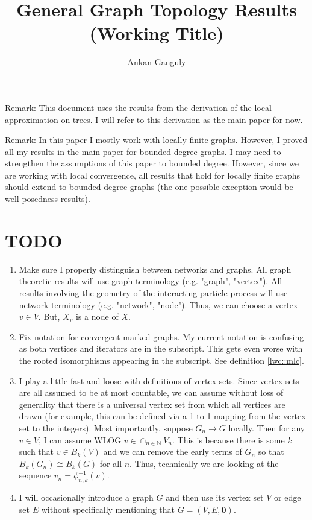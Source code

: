 \documentclass[12pt]{article}
\newcommand{\skipLine}{\vspace{12pt}}
\newcommand{\mb}{\mathbb}
\newcommand{\ra}{\rightarrow}
\renewcommand{\root}{\mathbf{0}}					%
\newcommand{\Xf}{X}									%
\newcommand{\vind}[1]{_{#1}}						%
\newcommand{\trnc}[1]{B_{#1}}						%
\begin{document}
\title{General Graph Topology Results (Working Title)}
\author{Ankan Ganguly}

\maketitle

Remark: This document uses the results from the derivation of the local approximation on trees. I will refer to this derivation as the main paper for now.

\skipLine

Remark: In this paper I mostly work with locally finite graphs. However, I proved all my results in the main paper for bounded degree graphs. I may need to strengthen the assumptions of this paper to bounded degree. However, since we are working with local convergence, all results that hold for locally finite graphs should extend to bounded degree graphs (the one possible exception would be well-posedness results).

\section{TODO}

\begin{enumerate}
\item Make sure I properly distinguish between networks and graphs. All graph theoretic results will use graph terminology (e.g. "graph", "vertex"). All results involving the geometry of the interacting particle process will use network terminology (e.g. "network", "node"). Thus, we can choose a vertex \(v \in V\). But, \(\Xf\vind{v}\) is a node of \(\Xf\).

\item Fix notation for convergent marked graphs. My current notation is confusing as both vertices and iterators are in the subscript. This gets even worse with the rooted isomorphisms appearing in the subscript. See definition \ref{lwc::mlc}.

\item I play a little fast and loose with definitions of vertex sets. Since vertex sets are all assumed to be at most countable, we can assume without loss of generality that there is a universal vertex set from which all vertices are drawn (for example, this can be defined via a 1-to-1 mapping from the vertex set to the integers). Most importantly, suppose \(G_n \ra G\) locally. Then for any \(v \in V\), I can assume WLOG \(v \in \cap_{n \in \mb{N}} V_n\). This is because there is some \(k\) such that \(v \in \trnc{k}(V)\) and we can remove the early terms of \(G_n\) so that \(\trnc{k}(G_n) \cong \trnc{k}(G)\) for all \(n\). Thus, technically we are looking at the sequence \(v_n = \phi_{n,k}^{-1}(v)\).

\item I will occasionally introduce a graph \(G\) and then use its vertex set \(V\) or edge set \(E\) without specifically mentioning that \(G = (V,E,\root)\). 
\end{enumerate}
\end{document}
